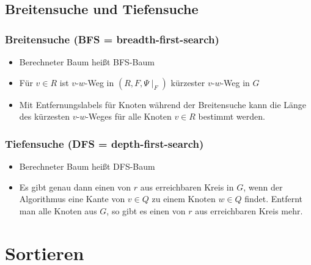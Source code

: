 \documentclass[a4paper,12pt]{article}
\theoremstyle{definition}
\begin{document}
	\setcounter{section}{7}
	\setcounter{subsection}{1}
	\subsection{Breitensuche und Tiefensuche}
	\subsubsection*{Breitensuche (BFS = breadth-first-search)}
	\begin{itemize}
		\item Berechneter Baum heißt BFS-Baum
		\item Für $v \in R$ ist $v$-$w$-Weg in $(R, F, \Psi\mid_F)$ kürzester $v$-$w$-Weg in $G$
		\item Mit Entfernungslabels für Knoten während der Breitensuche kann die Länge des kürzesten $v$-$w$-Weges für alle Knoten $v \in R$ bestimmt werden. 
	\end{itemize}
	\subsubsection*{Tiefensuche (DFS = depth-first-search)}
	\begin{itemize}
		\item Berechneter Baum heißt DFS-Baum
		\item Es gibt genau dann einen von $r$ aus erreichbaren Kreis in $G$, wenn der Algorithmus eine Kante von $v \in Q$ zu einem Knoten $w \in Q$ findet. Entfernt man alle Knoten aus $G$, so gibt es einen von $r$ aus erreichbaren Kreis mehr.
	\end{itemize}
	\section{Sortieren}
\end{document}

